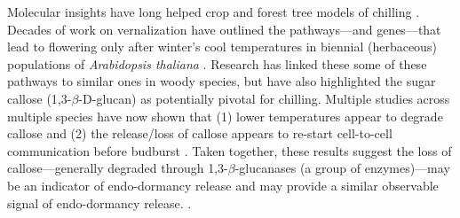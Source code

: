 \documentclass[11pt]{article}
\begin{document}
Molecular insights have long helped crop and forest tree models of chilling \citep{chuinearees}. Decades of work on vernalization have outlined the pathways---and genes---that lead to flowering only after winter's cool temperatures in biennial (herbaceous) populations of \emph{Arabidopsis thaliana} \citep[Fig. \ref{fig:molecular}][]{Wilczek:2009oa,kim2009vernalization}. Research has linked these some of these pathways to similar ones in woody species, but have also highlighted the sugar callose (1,3-$\beta$-{\sc D}-glucan) as potentially pivotal for chilling. Multiple studies across multiple species have now shown that (1) lower temperatures appear to degrade callose and (2) the release/loss of callose appears to re-start cell-to-cell communication before budburst \citep{vanderschoot2014}. Taken together, these results suggest the loss of callose---generally degraded through 1,3-$\beta$-glucanases (a group of enzymes)---may be an indicator of endo-dormancy release \citep[though other factors (e.g., ABA) also often change at the same time,][]{tylewicz2018photoperiodic,pan2021aba} and may provide a similar observable signal of endo-dormancy release. \citep{rinne2018,andre2022populus}. 



\end{document}
